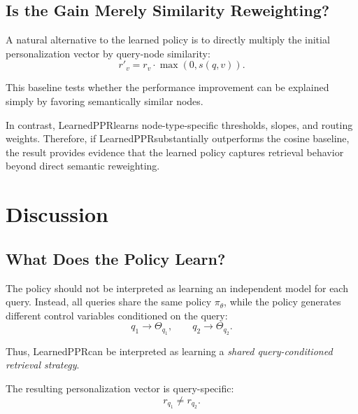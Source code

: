\documentclass[conference]{IEEEtran}
\newcommand{\method}{LearnedPPR}
\newcommand{\q}{q}
\newcommand{\reset}{r}
\newcommand{\policy}{\pi_{\theta}}
\begin{document}
\subsection{Is the Gain Merely Similarity Reweighting?}

A natural alternative to the learned policy is to directly multiply
the initial personalization vector by query-node similarity:
\begin{equation}
r'_v
=
r_v
\cdot
\max(0,s(\q,v)).
\label{eq:cosine-baseline}
\end{equation}

This baseline tests whether the performance improvement can be
explained simply by favoring semantically similar nodes.

In contrast, \method learns node-type-specific thresholds, slopes,
and routing weights. Therefore, if \method substantially outperforms
the cosine baseline, the result provides evidence that the learned
policy captures retrieval behavior beyond direct semantic
reweighting.



\section{Discussion}

\subsection{What Does the Policy Learn?}

The policy should not be interpreted as learning an independent model
for each query. Instead, all queries share the same policy
$\policy$, while the policy generates different control variables
conditioned on the query:
\begin{equation}
\q_1\rightarrow\Theta_{\q_1},
\qquad
\q_2\rightarrow\Theta_{\q_2}.
\end{equation}

Thus, \method can be interpreted as learning a
\emph{shared query-conditioned retrieval strategy}.

The resulting personalization vector is query-specific:
\begin{equation}
\reset_{\q_1}\neq\reset_{\q_2}.
\end{equation}
\end{document}
